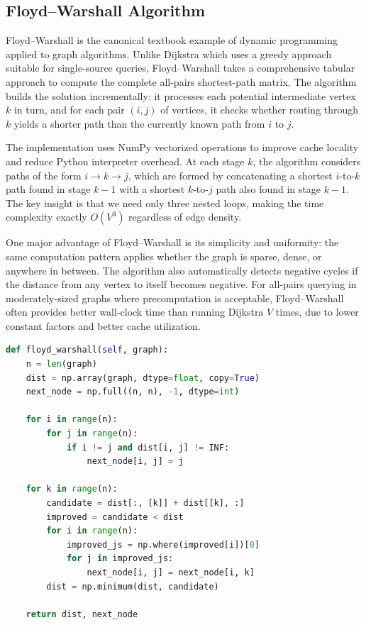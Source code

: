\documentclass[12pt]{article}
\begin{document}
\subsection{Floyd--Warshall Algorithm}

Floyd--Warshall is the canonical textbook example of dynamic programming applied to
graph algorithms. Unlike Dijkstra which uses a greedy approach suitable for single-source queries,
Floyd--Warshall takes a comprehensive tabular approach to compute the complete all-pairs shortest-path
matrix. The algorithm builds the solution incrementally: it processes each potential intermediate vertex
$k$ in turn, and for each pair $(i,j)$ of vertices, it checks whether routing through $k$ yields a
shorter path than the currently known path from $i$ to $j$.

The implementation uses NumPy vectorized operations to improve cache locality and reduce Python
interpreter overhead. At each stage $k$, the algorithm considers paths of the form $i \to k \to j$,
which are formed by concatenating a shortest $i$-to-$k$ path found in stage $k-1$ with a shortest
$k$-to-$j$ path also found in stage $k-1$. The key insight is that we need only three nested loops,
making the time complexity exactly $O(V^3)$ regardless of edge density.

One major advantage of Floyd--Warshall is its simplicity and uniformity: the same computation pattern
applies whether the graph is sparse, dense, or anywhere in between. The algorithm also automatically
detects negative cycles if the distance from any vertex to itself becomes negative. For all-pairs
querying in moderately-sized graphs where precomputation is acceptable, Floyd--Warshall often provides
better wall-clock time than running Dijkstra $V$ times, due to lower constant factors and better
cache utilization.

\begin{lstlisting}[language=Python, caption={Floyd--Warshall (main.py)}, label={lst:fw-py}]
def floyd_warshall(self, graph):
    n = len(graph)
    dist = np.array(graph, dtype=float, copy=True)
    next_node = np.full((n, n), -1, dtype=int)

    for i in range(n):
        for j in range(n):
            if i != j and dist[i, j] != INF:
                next_node[i, j] = j

    for k in range(n):
        candidate = dist[:, [k]] + dist[[k], :]
        improved = candidate < dist
        for i in range(n):
            improved_js = np.where(improved[i])[0]
            for j in improved_js:
                next_node[i, j] = next_node[i, k]
        dist = np.minimum(dist, candidate)

    return dist, next_node
\end{lstlisting}
\end{document}
